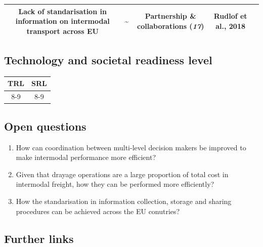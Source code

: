 \documentclass[
]{book}
\providecommand{\tightlist}{%
  \setlength{\itemsep}{0pt}\setlength{\parskip}{0pt}}
\begin{document}
\begin{longtable}[]{@{}ccccc@{}}
\begin{minipage}[t]{0.16\columnwidth}
Lack of standarisation in information on intermodal transport across EU\strut
\end{minipage} & \begin{minipage}[t]{0.17\columnwidth}\centering
\textbf{\textasciitilde{}}\strut
\end{minipage} & \begin{minipage}[t]{0.17\columnwidth}\centering
Partnership \& collaborations (\emph{17})\strut
\end{minipage} & \begin{minipage}[t]{0.17\columnwidth}\centering
Rudlof et al., 2018\strut
\end{minipage}\tabularnewline
\bottomrule
\end{longtable}

\hypertarget{technology-and-societal-readiness-level-22}{%
\subsection*{Technology and societal readiness level}\label{technology-and-societal-readiness-level-22}}

\begin{longtable}[]{@{}cc@{}}
\toprule
TRL & SRL\tabularnewline
\midrule
\endhead
8-9 & 8-9\tabularnewline
\bottomrule
\end{longtable}

\hypertarget{open-questions-22}{%
\subsection*{Open questions}\label{open-questions-22}}

\begin{enumerate}
\def\labelenumi{\arabic{enumi}.}
\tightlist
\item
  How can coordination between multi-level decision makers be improved to make intermodal performance more efficient?
\item
  Given that drayage operations are a large proportion of total cost in intermodal freight, how they can be performed more efficiently?
\item
  How the standarisation in information collection, storage and sharing procedures can be achieved across the EU conutries?
\end{enumerate}

\hypertarget{further-links-19}{%
\subsection*{Further links}\label{further-links-19}}
\end{document}
